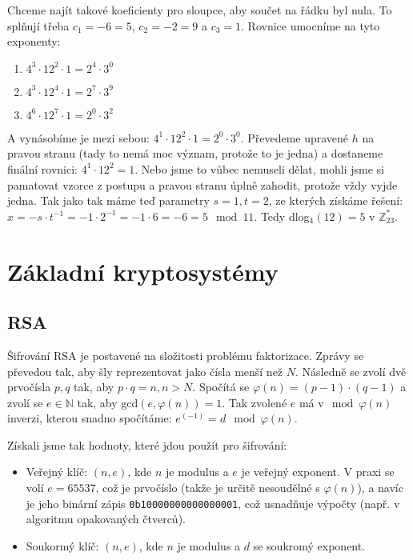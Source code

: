 \documentclass[10pt,a4paper]{article}
\begin{document}
\begin{exercise}
\begin{enumerate}
Chceme najít takové koeficienty pro sloupce, aby součet na řádku byl nula. To
splňují třeba $c_1 = -6 = 5$, $c_2 = -2 = 9$ a $c_3 = 1$.  Rovnice umocníme na
tyto exponenty:

\begin{enumerate}
\item $4^3\cdot 12^2 \cdot 1 = 2^4\cdot 3^0$
\item $4^3\cdot 12^4 \cdot 1 = 2^7\cdot 3^9$
\item $4^6\cdot 12^7 \cdot 1 = 2^0\cdot 3^2$
\end{enumerate}

A vynásobíme je mezi sebou: $4^1\cdot 12^2 \cdot 1 = 2^0\cdot 3^0$. Převedeme
upravené $h$ na pravou stranu (tady to nemá moc význam, protože to je jedna) a
dostaneme finální rovnici: $4^1\cdot 12^2  = 1$. Nebo jsme to vůbec nemuseli
dělat, mohli jsme si pamatovat vzorce z postupu a pravou stranu úplně zahodit,
protože vždy vyjde jedna. Tak jako tak máme teď parametry $s=1, t=2$, ze kterých
získáme řešení: $x = -s\cdot t^{-1} = -1 \cdot 2^{-1} = -1 \cdot 6 = -6 = 5 \mod
11$. Tedy dlog$_4(12) = 5$ v $\mathbb{Z}_{23}^*$.
\end{enumerate}
\end{exercise}

\section{Základní kryptosystémy}
\subsection{RSA}
Šifrování RSA je postavené na složitosti problému faktorizace. Zprávy se
převedou tak, aby šly reprezentovat jako čísla menší než $N$. Následně se zvolí
dvě prvočísla $p, q$ tak, aby $p \cdot q = n, n > N$. Spočítá se $\varphi(n) =
(p-1)\cdot (q-1)$ a zvolí se $e \in \mathbb{N}$ tak, aby gcd$(e, \varphi(n)) =
1$. Tak zvolené $e$ má v$\mod \varphi(n)$ inverzi, kterou snadno spočítáme:
$e^(-1) = d \mod \varphi(n)$.

Získali jsme tak hodnoty, které jdou použít pro šifrování:
\begin{itemize}
    \item Veřejný klíč: $(n, e)$, kde $n$ je modulus a $e$ je veřejný exponent.
    V praxi se volí $e = 65537$, což je prvočíslo (takže je určitě nesoudělné s
    $\varphi(n)$), a navíc je jeho binární zápis \texttt{0b10000000000000001},
    což usnadňuje výpočty (např. v algoritmu opakovaných čtverců).
    \item Soukormý klíč: $(n, e)$, kde $n$ je modulus a $d$ se soukromý
    exponent.
\end{itemize}
\end{document}
